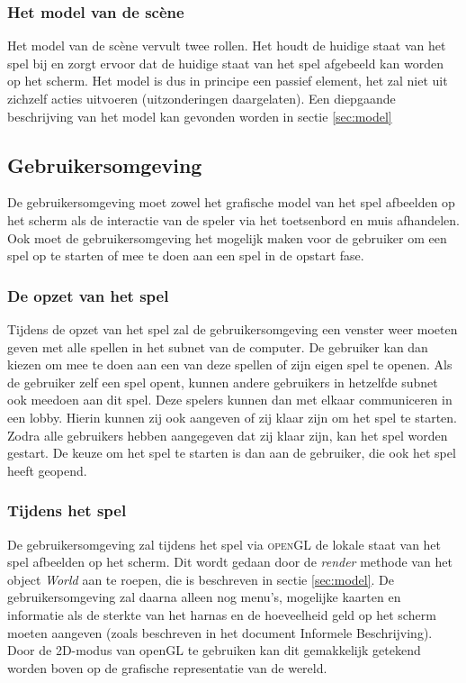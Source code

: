     \subsubsection{Het model van de sc\`ene}
    Het model van de sc\`ene vervult twee rollen. Het houdt de huidige staat van het spel bij en zorgt ervoor dat de huidige staat van het spel afgebeeld kan worden op het scherm. Het model is dus in principe een passief element, het zal niet uit zichzelf acties uitvoeren (uitzonderingen daargelaten). Een diepgaande beschrijving van het model kan gevonden worden in sectie \ref{sec:model}

    \subsection{Gebruikersomgeving}
    De gebruikersomgeving moet zowel het grafische model van het spel afbeelden op het scherm als de interactie van de speler via het toetsenbord en muis afhandelen. Ook moet de gebruikersomgeving het mogelijk maken voor de gebruiker om een spel op te starten of mee te doen aan een spel in de opstart fase.

    \subsubsection{De opzet van het spel}
    Tijdens de opzet van het spel zal de gebruikersomgeving een venster weer moeten geven met alle spellen in het subnet van de computer. De gebruiker kan dan kiezen om mee te doen aan een van deze spellen of zijn eigen spel te openen. Als de gebruiker zelf een spel opent, kunnen andere gebruikers in hetzelfde subnet ook meedoen aan dit spel. Deze spelers kunnen dan met elkaar communiceren in een lobby. Hierin kunnen zij ook aangeven of zij klaar zijn om het spel te starten. Zodra alle gebruikers hebben aangegeven dat zij klaar zijn, kan het spel worden gestart. De keuze om het spel te starten is dan aan de gebruiker, die ook het spel heeft geopend.

    \subsubsection{Tijdens het spel}
    De gebruikersomgeving zal tijdens het spel via \textsc{openGL} de lokale staat van het spel afbeelden op het scherm. Dit wordt gedaan door de \emph{render} methode van het object \emph{World} aan te roepen, die is beschreven in sectie \ref{sec:model}. De gebruikersomgeving zal daarna alleen nog menu's, mogelijke kaarten en informatie als de sterkte van het harnas en de hoeveelheid geld op het scherm moeten aangeven (zoals beschreven in het document Informele Beschrijving). Door de 2D-modus van openGL te gebruiken kan dit gemakkelijk getekend worden boven op de grafische representatie van de wereld.

